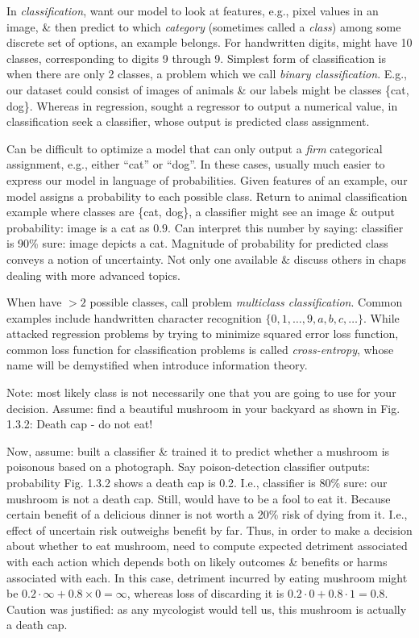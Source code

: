 \documentclass{article}
\begin{document}
\begin{enumerate}
\begin{itemize}
\begin{itemize}
\begin{itemize}
\begin{itemize}
					In {\it classification}, want our model to look at features, e.g., pixel values in an image, \& then predict to which {\it category} (sometimes called a {\it class}) among some discrete set of options, an example belongs. For handwritten digits, might have 10 classes, corresponding to digits 9 through 9. Simplest form of classification is when there are only 2 classes, a problem which we call {\it binary classification}. E.g., our dataset could consist of images of animals \& our labels might be classes \{cat, dog\}. Whereas in regression, sought a regressor to output a numerical value, in classification seek a classifier, whose output is predicted class assignment.
					
					Can be difficult to optimize a model that can only output a {\it firm} categorical assignment, e.g., either ``cat'' or ``dog''. In these cases, usually much easier to express our model in language of probabilities. Given features of an example, our model assigns a probability to each possible class. Return to animal classification example where classes are \{cat, dog\}, a classifier might see an image \& output probability: image is a cat as $0.9$. Can interpret this number by saying: classifier is 90\% sure: image depicts a cat. Magnitude of probability for predicted class conveys a notion of uncertainty. Not only one available \& discuss others in chaps dealing with more advanced topics.
					
					When have $> 2$ possible classes, call problem {\it multiclass classification}. Common examples include handwritten character recognition $\{0,1,\ldots,9,a,b,c,\ldots\}$. While attacked regression problems by trying to minimize squared error loss function, common loss function for classification problems is called {\it cross-entropy}, whose name will be demystified when introduce information theory.
					
					Note: most likely class is not necessarily one that you are going to use for your decision. Assume: find a beautiful mushroom in your backyard as shown in {\sf Fig. 1.3.2: Death cap - do not eat!}
					
					Now, assume: built a classifier \& trained it to predict whether a mushroom is poisonous based on a photograph. Say poison-detection classifier outputs: probability Fig. 1.3.2 shows a death cap is 0.2. I.e., classifier is 80\% sure: our mushroom is not a death cap. Still, would have to be a fool to eat it. Because certain benefit of a delicious dinner is not worth a 20\% risk of dying from it. I.e., effect of uncertain risk outweighs benefit by far. Thus, in order to make a decision about whether to eat mushroom, need to compute expected detriment associated with each action which depends both on likely outcomes \& benefits or harms associated with each. In this case, detriment incurred by eating mushroom might be $0.2\cdot\infty + 0.8\times0 = \infty$, whereas loss of discarding it is $0.2\cdot0 + 0.8\cdot1 = 0.8$. Caution was justified: as any mycologist would tell us, this mushroom is actually a death cap.
					

\end{itemize}
\end{itemize}
\end{itemize}
\end{itemize}
\end{enumerate}
\end{document}
